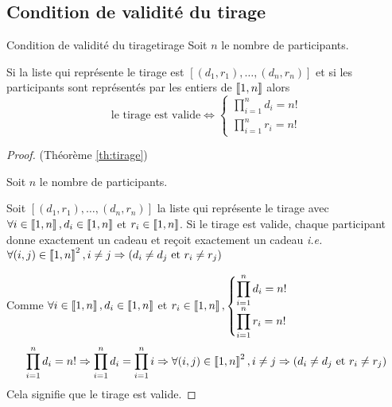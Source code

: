 \documentclass[a4paper, 12pt]{report}
\begin{document}
        \subsection{Condition de validité du tirage}
            \begin{theorem}{Condition de validité du tirage}{tirage}
                Soit $n$ le nombre de participants.
                
                Si la liste qui représente le tirage est $[(d_1, r_1), \ldots, (d_n, r_n)]$  et si les participants sont représentés par les entiers de $\left\llbracket1, n\right\rrbracket$ alors 
                \[\text{le tirage est valide} \iff
                \begin{cases}
                    \displaystyle\prod_{i=1}^nd_i=n ! \\
                    \displaystyle\prod_{i=1}^nr_i=n !
                \end{cases}\]
            \end{theorem}
            \begin{proof}
                (Théorème \ref{th:tirage})
                
                Soit $n$ le nombre de participants.
                
                Soit $[(d_1, r_1), \ldots, (d_n, r_n)]$  la liste qui représente le tirage avec $\forall i\in\left\llbracket1, n\right\rrbracket, d_i\in\left\llbracket1, n\right\rrbracket$ et $r_i\in\left\llbracket1, n\right\rrbracket$.
                \bigbreak
                \fbox{$\Rightarrow$} Si le tirage est valide, chaque participant donne exactement un cadeau et reçoit exactement un cadeau \textit{i.e.}
                $\forall(i, j)\in\left\llbracket1, n\right\rrbracket^2,i\neq j\Rightarrow (d_i\neq d_j \text{ et } r_i \neq r_j)$
                
                Comme $\forall i\in\left\llbracket1, n\right\rrbracket, d_i\in\left\llbracket1, n\right\rrbracket$ et $r_i\in\left\llbracket1, n\right\rrbracket, 
                \begin{cases}
                    \displaystyle\prod_{i=1}^nd_i=n ! \\
                    \displaystyle\prod_{i=1}^nr_i=n !
                \end{cases}$
                \bigbreak
                \fbox{$\Leftarrow$} 
                \[\prod_{i=1}^nd_i=n ! \Rightarrow \prod_{i=1}^nd_i=\prod_{i=1}^ni \Rightarrow \forall(i, j)\in\left\llbracket1, n\right\rrbracket^2,i\neq j\Rightarrow (d_i\neq d_j \text{ et } r_i \neq r_j)\]
                Cela signifie que le tirage est valide.
            \end{proof}
\end{document}
